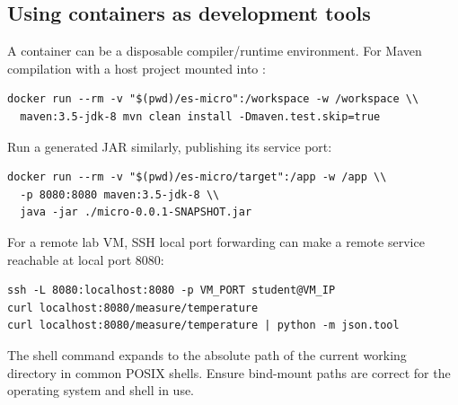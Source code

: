 \documentclass[11pt,a4paper]{article}
\newcommand{\cmd}[1]{\texttt{\detokenize{#1}}}
\begin{document}
\subsection{Using containers as development tools}
A container can be a disposable compiler/runtime environment. For Maven compilation with a host project mounted into \cmd{/workspace}:
\begin{lstlisting}
docker run --rm -v "$(pwd)/es-micro":/workspace -w /workspace \\
  maven:3.5-jdk-8 mvn clean install -Dmaven.test.skip=true
\end{lstlisting}
Run a generated JAR similarly, publishing its service port:
\begin{lstlisting}
docker run --rm -v "$(pwd)/es-micro/target":/app -w /app \\
  -p 8080:8080 maven:3.5-jdk-8 \\
  java -jar ./micro-0.0.1-SNAPSHOT.jar
\end{lstlisting}
For a remote lab VM, SSH local port forwarding can make a remote service reachable at local port 8080:
\begin{lstlisting}
ssh -L 8080:localhost:8080 -p VM_PORT student@VM_IP
curl localhost:8080/measure/temperature
curl localhost:8080/measure/temperature | python -m json.tool
\end{lstlisting}
The shell command \cmd{$(pwd)} expands to the absolute path of the current working directory in common POSIX shells. Ensure bind-mount paths are correct for the operating system and shell in use.
\end{document}
